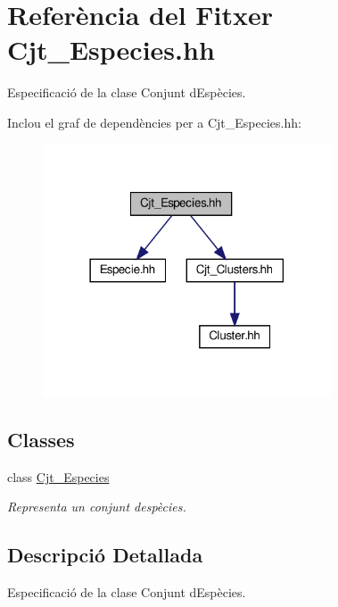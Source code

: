\hypertarget{_cjt___especies_8hh}{}\section{Referència del Fitxer Cjt\+\_\+\+Especies.\+hh}
\label{_cjt___especies_8hh}


Especificació de la clase Conjunt d\textquotesingle{}Espècies.  


Inclou el graf de dependències per a Cjt\+\_\+\+Especies.\+hh\+:\nopagebreak
\begin{figure}[H]
\begin{center}
\leavevmode
\includegraphics[width=242pt]{_cjt___especies_8hh__incl}
\end{center}
\end{figure}
\subsection*{Classes}
\begin{DoxyCompactItemize}
\item 
class \hyperlink{class_cjt___especies}{Cjt\+\_\+\+Especies}
\begin{DoxyCompactList}\small\item\em Representa un conjunt d\textquotesingle{}espècies. \end{DoxyCompactList}\end{DoxyCompactItemize}


\subsection{Descripció Detallada}
Especificació de la clase Conjunt d\textquotesingle{}Espècies. 

